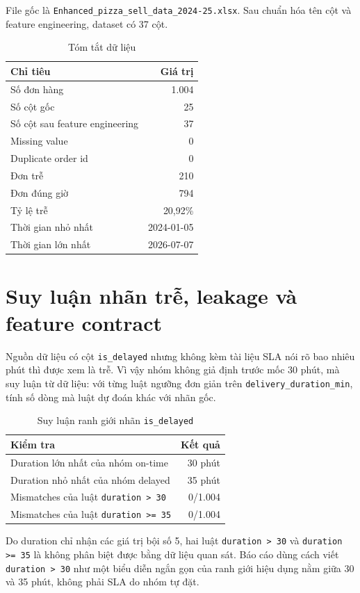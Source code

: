 \documentclass[12pt,a4paper,oneside]{report}
\newcommand{\code}[1]{\nolinkurl{#1}}
\begin{document}
File gốc là \code{Enhanced\_pizza\_sell\_data\_2024-25.xlsx}. Sau chuẩn hóa tên
cột và feature engineering, dataset có 37 cột.

\begin{table}[H]
\centering
\caption{Tóm tắt dữ liệu}
\begin{tabular}{lr}
\toprule
Chỉ tiêu & Giá trị\\
\midrule
Số đơn hàng & 1.004\\
Số cột gốc & 25\\
Số cột sau feature engineering & 37\\
Missing value & 0\\
Duplicate order id & 0\\
Đơn trễ & 210\\
Đơn đúng giờ & 794\\
Tỷ lệ trễ & 20,92\%\\
Thời gian nhỏ nhất & 2024-01-05\\
Thời gian lớn nhất & 2026-07-07\\
\bottomrule
\end{tabular}
\end{table}

\section{Suy luận nhãn trễ, leakage và feature contract}

Nguồn dữ liệu có cột \code{is\_delayed} nhưng không kèm tài liệu SLA nói rõ bao
nhiêu phút thì được xem là trễ. Vì vậy nhóm không giả định trước mốc 30 phút,
mà suy luận từ dữ liệu: với từng luật ngưỡng đơn giản trên
\code{delivery\_duration\_min}, tính số dòng mà luật dự đoán khác với nhãn gốc.

\begin{table}[H]
\centering
\caption{Suy luận ranh giới nhãn \code{is\_delayed}}
\begin{tabular}{lr}
\toprule
Kiểm tra & Kết quả\\
\midrule
Duration lớn nhất của nhóm on-time & 30 phút\\
Duration nhỏ nhất của nhóm delayed & 35 phút\\
Mismatches của luật \code{duration > 30} & 0/1.004\\
Mismatches của luật \code{duration >= 35} & 0/1.004\\
\bottomrule
\end{tabular}
\end{table}

Do duration chỉ nhận các giá trị bội số 5, hai luật \code{duration > 30} và
\code{duration >= 35} là không phân biệt được bằng dữ liệu quan sát. Báo cáo
dùng cách viết \code{duration > 30} như một biểu diễn ngắn gọn của ranh giới
hiệu dụng nằm giữa 30 và 35 phút, không phải SLA do nhóm tự đặt.
\end{document}
